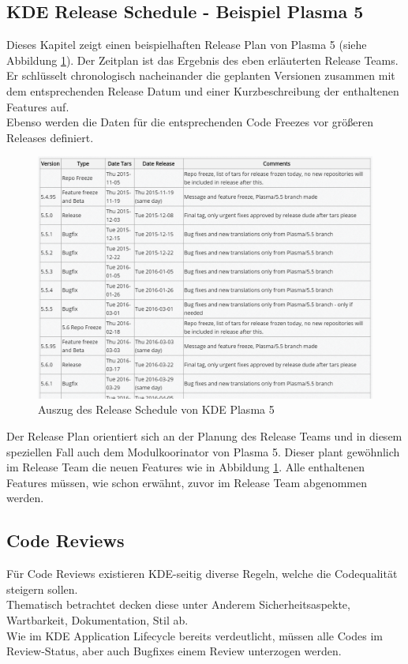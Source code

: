 \documentclass[10pt,a4paper,twocolumn]{article}
\begin{document}
\subsection{KDE Release Schedule - Beispiel Plasma 5 \cite{KDEReleaseSchedulePlasma5}}
Dieses Kapitel zeigt einen beispielhaften Release Plan von Plasma 5 (siehe Abbildung \ref{fig:kde_schedulePlasma5}). Der Zeitplan ist das Ergebnis des eben erläuterten Release Teams.\\
Er schlüsselt chronologisch nacheinander die geplanten Versionen zusammen mit dem entsprechenden Release Datum und einer Kurzbeschreibung der enthaltenen Features auf.\\
Ebenso werden die Daten für die entsprechenden Code Freezes vor größeren Releases definiert.
\begin{figure}[h]
	\centering
	\includegraphics[width=\columnwidth]{images/KDE_schedule_plasma5.png}
	\caption{Auszug des Release Schedule von KDE Plasma 5 \cite{KDEReleaseSchedulePlasma5}}
	\label{fig:kde_schedulePlasma5}
\end{figure}
Der Release Plan orientiert sich an der Planung des Release Teams und in diesem speziellen Fall auch dem Modulkoorinator von Plasma 5. Dieser plant gewöhnlich im Release Team die neuen Features wie in Abbildung \ref{fig:kde_schedulePlasma5}. Alle enthaltenen Features müssen, wie schon erwähnt, zuvor im Release Team abgenommen werden. 
\cite{KDEReleaseSchedulePlasma5}

\subsection{Code Reviews \cite{KDECodeReview}}
Für Code Reviews existieren KDE-seitig diverse Regeln, welche die Codequalität steigern sollen.\\
Thematisch betrachtet decken diese unter Anderem Sicherheitsaspekte, Wartbarkeit, Dokumentation, Stil ab.\\
Wie im KDE Application Lifecycle bereits verdeutlicht, müssen alle Codes im Review-Status, aber auch Bugfixes einem Review unterzogen werden.
\cite{KDECodeReview}

{}

\listoffigures
\end{document}
